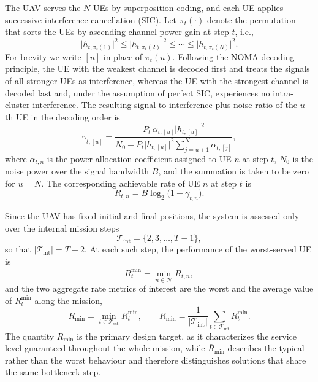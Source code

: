 \documentclass[conference]{IEEEtran}
\begin{document}
The UAV serves the $N$ UEs by superposition coding, and each UE applies
successive interference cancellation (SIC). Let $\pi_{t}(\cdot)$ denote
the permutation that sorts the UEs by ascending channel power gain at
step $t$, i.e.,
\begin{equation}
\label{eq:sic_order}
\big|h_{t,\pi_{t}(1)}\big|^{2}\le
\big|h_{t,\pi_{t}(2)}\big|^{2}\le\cdots\le
\big|h_{t,\pi_{t}(N)}\big|^{2}.
\end{equation}
For brevity we write $[u]$ in place of $\pi_{t}(u)$. Following the NOMA
decoding principle, the UE with the weakest channel is decoded first and
treats the signals of all stronger UEs as interference, whereas the UE
with the strongest channel is decoded last and, under the assumption of
perfect SIC, experiences no intra-cluster interference. The resulting
signal-to-interference-plus-noise ratio of the $u$-th UE in the decoding
order is
\begin{equation}
\label{eq:sinr}
\gamma_{t,[u]}
=\frac{P_{t}\,\alpha_{t,[u]}\big|h_{t,[u]}\big|^{2}}
      {N_{0}+P_{t}\big|h_{t,[u]}\big|^{2}
       \sum_{j=u+1}^{N}\alpha_{t,[j]}},
\end{equation}
where $\alpha_{t,n}$ is the power allocation coefficient assigned to UE
$n$ at step $t$, $N_{0}$ is the noise power over the signal bandwidth
$B$, and the summation is taken to be zero for $u=N$. The corresponding
achievable rate of UE $n$ at step $t$ is
\begin{equation}
\label{eq:rate}
R_{t,n}=B\log_{2}\big(1+\gamma_{t,n}\big).
\end{equation}

Since the UAV has fixed initial and final positions, the system is
assessed only over the internal mission steps
\begin{equation}
\label{eq:internal_steps}
\mathcal{T}_{\mathrm{int}}=\{2,3,\ldots,T-1\},
\end{equation}
so that $|\mathcal{T}_{\mathrm{int}}|=T-2$. At each such step, the
performance of the worst-served UE is
\begin{equation}
\label{eq:step_min_rate}
R_{t}^{\min}=\min_{n\in\mathcal{N}}R_{t,n},
\end{equation}
and the two aggregate rate metrics of interest are the worst and the
average value of $R_{t}^{\min}$ along the mission,
\begin{equation}
\label{eq:rate_aggregates}
R_{\min}=\min_{t\in\mathcal{T}_{\mathrm{int}}}R_{t}^{\min},
\qquad
\bar{R}_{\min}=\frac{1}{|\mathcal{T}_{\mathrm{int}}|}
\sum_{t\in\mathcal{T}_{\mathrm{int}}}R_{t}^{\min}.
\end{equation}
The quantity $R_{\min}$ is the primary design target, as it characterizes
the service level guaranteed throughout the whole mission, while
$\bar{R}_{\min}$ describes the typical rather than the worst behaviour
and therefore distinguishes solutions that share the same bottleneck
step.
\end{document}
